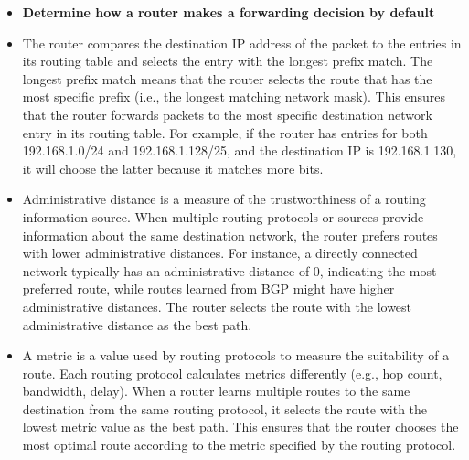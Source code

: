 \documentclass{article}
\begin{document}
\begin{itemize}
  \item \textbf{Determine how a router makes a forwarding decision by default}
  	\item[] The router compares the destination IP address of the packet to the entries in its routing table and selects the entry with the longest prefix match. The longest prefix match means that the router selects the route that has the most specific prefix (i.e., the longest matching network mask). This ensures that the router forwards packets to the most specific destination network entry in its routing table. For example, if the router has entries for both 192.168.1.0/24 and 192.168.1.128/25, and the destination IP is 192.168.1.130, it will choose the latter because it matches more bits.
	\item[] Administrative distance is a measure of the trustworthiness of a routing information source. When multiple routing protocols or sources provide information about the same destination network, the router prefers routes with lower administrative distances. For instance, a directly connected network typically has an administrative distance of 0, indicating the most preferred route, while routes learned from BGP might have higher administrative distances. The router selects the route with the lowest administrative distance as the best path.
	\item[] A metric is a value used by routing protocols to measure the suitability of a route. Each routing protocol calculates metrics differently (e.g., hop count, bandwidth, delay). When a router learns multiple routes to the same destination from the same routing protocol, it selects the route with the lowest metric value as the best path. This ensures that the router chooses the most optimal route according to the metric specified by the routing protocol.
  

\end{itemize}
\end{document}
